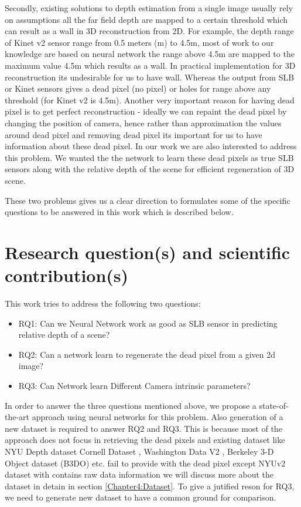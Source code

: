 Secondly, existing solutions to depth estimation from a single image usually rely on assumptions all the far field depth are mapped to a certain threshold which can result as a wall in 3D reconstruction from 2D. For example, the depth range of Kinet v2 sensor range from 0.5 meters (m) to 4.5m, most of work to our knowledge are based on neural network the range above 4.5m are mapped to the maximum value 4.5m \cite{Silberman:ECCV12} which results as a wall. In practical implementation for 3D reconstruction its undesirable for us to have wall. Whereas the output from SLB or Kinet sensors gives a dead pixel (no pixel) or holes for range above any threshold (for Kinet v2 is 4.5m). Another very important reason for having dead pixel is to get perfect reconstruction - ideally we can repaint the dead pixel by changing the position of camera, hence rather than approximation the values around dead pixel and removing dead pixel its important for us to have information about these dead pixel. In our work we are also interested to address this problem. We wanted the the network to learn these dead pixels as true SLB sensors along with the relative depth of the scene for efficient regeneration of 3D scene. 

These two problems gives us a clear direction to formulates some of the specific questions to be answered in this work which is described below. 


\section{Research question(s) and scientific contribution(s)}

This work tries to address the following two questions:
\begin{itemize}
    \item RQ1: Can we Neural Network work as good as SLB sensor in predicting relative depth of a scene?
    \item RQ2: Can a network learn to regenerate the dead pixel from a given 2d image?
    \item RQ3: Can Network learn Different Camera intrinsic parameters?  
\end{itemize}

In order to answer the three questions mentioned above, we propose a state-of-the-art approach using neural networks for this problem. Also generation of a new dataset is required to answer RQ2 and RQ3. This is because most of the approach does not focus in retrieving the dead pixels and existing dataset like NYU Depth dataset \cite{silberman11indoor} Cornell Dataset \cite{3Dscene} , Washington Data V2 \cite{Washington}, Berkeley 3-D Object dataset (B3DO) \cite{Janoch:EECS-2012-85} etc. fail to provide with the dead pixel except NYUv2 dataset with contains raw data information we will discuss more about the dataset in detain in section \ref{Chapter4:Dataset}. To give a jutified reson for RQ3, we need to generate new dataset to have a common ground for comparison. 

